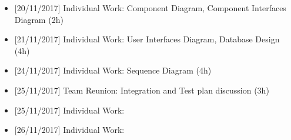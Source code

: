 \begin{itemize}
\begin{itemize}
            \item {[}20/11/2017{]} Individual Work: Component Diagram, Component Interfaces Diagram (2h)
            
            \item {[}21/11/2017{]} Individual Work: User Interfaces Diagram, Database Design (4h)

            \item {[}24/11/2017{]} Individual Work: Sequence Diagram (4h)          

            \item {[}25/11/2017{]} Team Reunion: Integration and Test plan discussion (3h)
            
            \item {[}25/11/2017{]} Individual Work:
            
            \item {[}26/11/2017{]} Individual Work:
            
        \end{itemize}
        
\end{itemize}